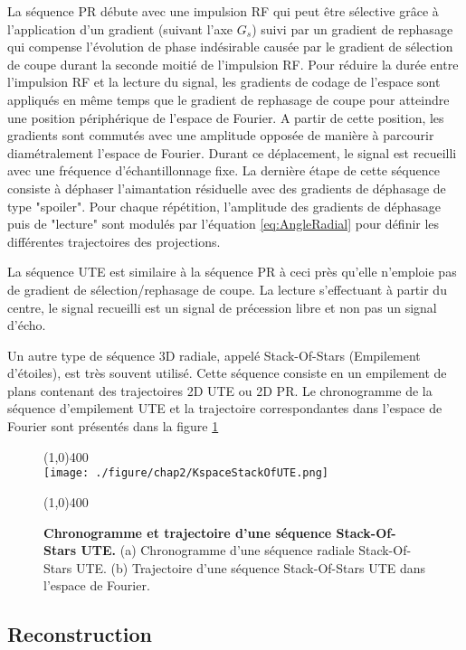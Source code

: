 La séquence PR débute avec une impulsion RF qui peut être sélective grâce à l'application d'un  gradient (suivant l'axe $G_s$) suivi par un gradient de rephasage qui compense l'évolution de phase indésirable causée par le gradient de sélection de coupe durant la seconde moitié de l'impulsion RF. Pour réduire la durée entre l'impulsion RF et la lecture du signal, les gradients de codage de l'espace sont appliqués en même temps que le gradient de rephasage de coupe pour atteindre une position périphérique de l'espace de Fourier. A partir de cette position, les gradients sont commutés avec une amplitude opposée de manière à parcourir diamétralement l'espace de Fourier. Durant ce déplacement, le signal est recueilli avec une fréquence d'échantillonnage fixe. La dernière étape de cette séquence consiste à déphaser l'aimantation résiduelle avec des gradients de déphasage de type "spoiler". Pour chaque répétition, l'amplitude des gradients de déphasage puis de "lecture" sont modulés par l'équation \ref{eq:AngleRadial} pour définir les différentes trajectoires des projections.

La séquence UTE est similaire à la séquence PR à ceci près qu'elle n'emploie pas 
de gradient de sélection/rephasage de coupe. La lecture s'effectuant à partir du centre, le signal recueilli est un signal de précession libre et non pas un signal d'écho.

Un autre type de séquence 3D radiale, appelé Stack-Of-Stars (Empilement d'étoiles), est très souvent utilisé. Cette séquence consiste en un empilement de plans contenant des trajectoires 2D UTE ou 2D PR. Le chronogramme de la séquence d'empilement UTE et la trajectoire correspondantes dans l'espace de Fourier sont présentés dans la figure \ref{fig:KspaceStackOfUTE}

\begin{figure}[H]
\centering
\line(1,0){400} \\
\texttt{[image: ./figure/chap2/KspaceStackOfUTE.png]}
\caption[Chronogramme et trajectoire d'une séquence Stack-Of-Stars UTE.]{\label{fig:KspaceStackOfUTE} \textbf{Chronogramme et trajectoire d'une séquence Stack-Of-Stars UTE.} (a) Chronogramme d'une séquence radiale Stack-Of-Stars UTE. (b) Trajectoire d'une séquence Stack-Of-Stars UTE dans l'espace de Fourier. } 
\line(1,0){400} \\
\end{figure}

\subsection{Reconstruction}


